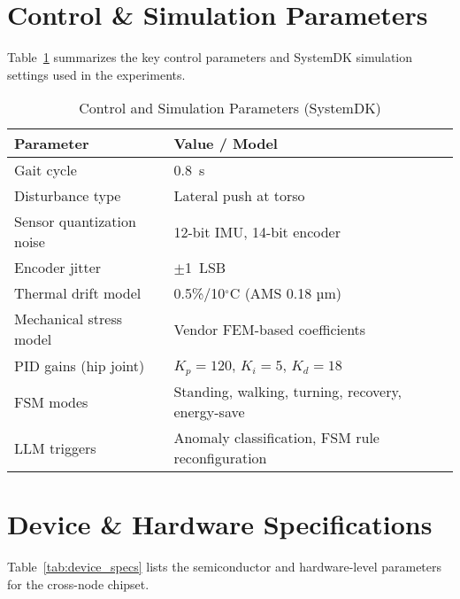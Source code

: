 \documentclass[journal]{IEEEtran}
\begin{document}
\section{Control \& Simulation Parameters}
\label{appendix:control}

Table~\ref{tab:control_params} summarizes the key control parameters 
and SystemDK simulation settings used in the experiments.

\begin{table}[h]
\centering
\caption{Control and Simulation Parameters (SystemDK)}
\label{tab:control_params}
\renewcommand{\arraystretch}{1.2}
\footnotesize
\begin{tabular}{p{4.2cm} p{3.6cm}}
\toprule
\textbf{Parameter} & \textbf{Value / Model} \\
\midrule
Gait cycle & 0.8~s \\
Disturbance type & Lateral push at torso \\
Sensor quantization noise & 12-bit IMU, 14-bit encoder \\
Encoder jitter & $\pm$1~LSB \\
Thermal drift model & 0.5\%/10$^\circ$C (AMS 0.18 µm) \\
Mechanical stress model & Vendor FEM-based coefficients \\
PID gains (hip joint) & $K_p=120$, $K_i=5$, $K_d=18$ \\
FSM modes & Standing, walking, turning, recovery, energy-save \\
LLM triggers & Anomaly classification, FSM rule reconfiguration \\
\bottomrule
\end{tabular}
\end{table}

\section{Device \& Hardware Specifications}
\label{appendix:device}

Table~\ref{tab:device_specs} lists the semiconductor and hardware-level parameters 
for the cross-node chipset.
\end{document}
